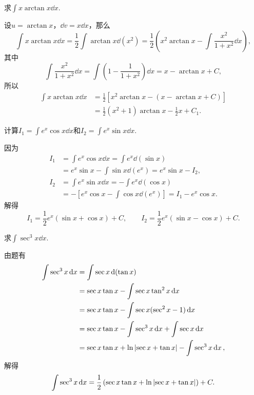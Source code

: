 \begin{example}
求\(\int x \arctan x \dd{x}\).
\begin{solution}
设\(u = \arctan x\)，\(\dd{v} = x \dd{x}\)，那么\[
\int x \arctan x \dd{x}
= \frac{1}{2} \int \arctan x \dd(x^2)
= \frac{1}{2} \left( x^2 \arctan x
	- \int \frac{x^2}{1+x^2} \dd{x} \right),
\]其中\[
\int \frac{x^2}{1+x^2} \dd{x}
= \int \left(1-\frac{1}{1+x^2}\right) \dd{x}
= x - \arctan x + C,
\]所以\begin{align*}
\int x \arctan x \dd{x}
&= \frac{1}{2} \left[ x^2 \arctan x
	- (x - \arctan x + C) \right] \\
&= \frac{1}{2} (x^2+1) \arctan x - \frac{1}{2} x + C_1.
\end{align*}
\end{solution}
\end{example}

\begin{example}
计算\(I_1 = \int e^x \cos x\dd{x}\)和\(I_2 = \int e^x \sin x\dd{x}\).
\begin{solution}
因为\begin{align*}
I_1 &= \int e^x \cos x\dd{x}
= \int e^x \dd(\sin x) \\
&= e^x \sin x - \int \sin x \dd(e^x)
= e^x \sin x - I_2, \\
I_2 &= \int e^x \sin x\dd{x}
= -\int e^x \dd(\cos x) \\
&= -\left[ e^x \cos x - \int \cos x \dd(e^x) \right]
= I_1 - e^x \cos x.
\end{align*}解得\[
I_1 = \frac{1}{2} e^x (\sin x + \cos x) + C,
\qquad
I_2 = \frac{1}{2} e^x (\sin x - \cos x) + C.
\]
\end{solution}
\end{example}

\begin{example}
求\(\int \sec^3 x \dd{x}\).
\begin{solution}
由题有\begin{align*}
\int \sec^3 x \dd{x}
&= \int \sec x \dd(\tan x) \\
&= \sec x \tan x - \int \sec x \tan^2 x \dd{x} \\
&= \sec x \tan x - \int \sec x (\sec^2 x - 1) \dd{x} \\
&= \sec x \tan x - \int \sec^3 x \dd{x} + \int \sec x \dd{x} \\
&= \sec x \tan x + \ln\abs{\sec x + \tan x} - \int \sec^3 x \dd{x},
\end{align*}解得\[
\int \sec^3 x \dd{x}
= \frac{1}{2} \left(
	\sec x \tan x
	+ \ln\abs{\sec x + \tan x}
\right) + C.
\]
\end{solution}
\end{example}

